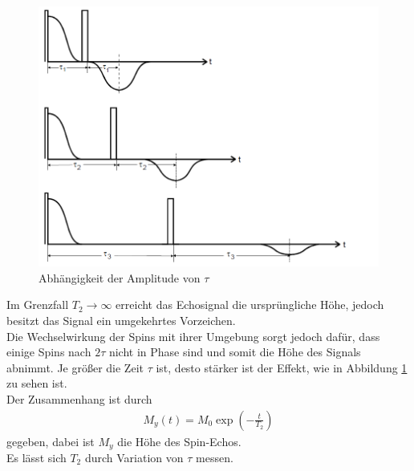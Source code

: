 \documentclass[]{scrartcl}
\begin{document}
\begin{figure}[H]
\centering
\includegraphics[width=12cm]{images/tauechohoehe.png}
\caption{Abhängigkeit der Amplitude von $\tau$}
\label{fig::tauechohoehe}
\end{figure}
Im Grenzfall $T_2 \to \infty$ erreicht das Echosignal die ursprüngliche Höhe, jedoch besitzt das Signal ein umgekehrtes Vorzeichen.\\
Die Wechselwirkung der Spins mit ihrer Umgebung sorgt jedoch dafür, dass einige Spins nach $2\tau$ nicht in Phase sind und somit die Höhe des Signals abnimmt. Je größer die Zeit $\tau$ ist, desto stärker ist der Effekt, wie in Abbildung \ref{fig::tauechohoehe} zu sehen ist.\\
Der Zusammenhang ist durch
\begin{align}
M_y\left(t\right)=M_0\exp \left(-\frac{t}{T_2}\right)\label{eq::rechnung_tau_spin_echo}
\end{align} 
gegeben, dabei ist $M_y$ die Höhe des Spin-Echos.\\ 
Es lässt sich $T_2$ durch Variation von $\tau$ messen.
\end{document}
